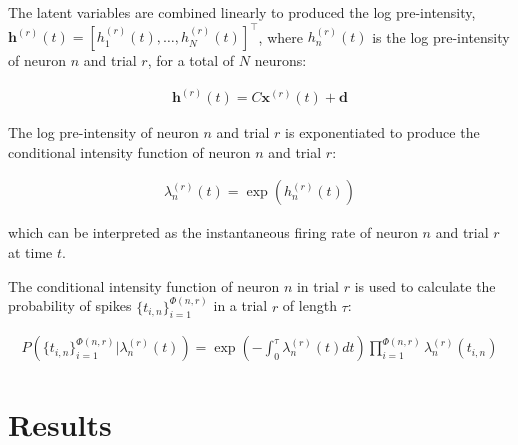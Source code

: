 \documentclass[12pt]{article}
\begin{document}
The latent variables are combined linearly to produced the log pre-intensity,
$\mathbf{h}^{(r)}(t)=[h_1^{(r)}(t),\ldots,h_N^{(r)}(t)]^\intercal$, where
$h_n^{(r)}(t)$ is the log
pre-intensity of neuron $n$ and trial $r$, for a total of $N$ neurons:

\begin{align}
    \mathbf{h}^{(r)}(t)=C\mathbf{x}^{(r)}(t)+\mathbf{d}
    \label{eq:logPreIntensity}
\end{align}

The log pre-intensity of neuron $n$ and trial $r$ is exponentiated to produce the conditional
intensity function of neuron $n$ and trial $r$:

\begin{align}
    \lambda_n^{(r)}(t)=\exp(h_n^{(r)}(t))
    \label{eq:cif}
\end{align}

\noindent which can be interpreted as the instantaneous firing rate of neuron
$n$ and trial $r$ at time $t$.

The conditional intensity function of neuron $n$ in trial $r$ is used to calculate the
probability of spikes $\{t_{i,n}\}_{i=1}^{\Phi(n,r)}$ in a trial $r$ of length $\tau$:

\begin{align*}
    P(\{t_{i,n}\}_{i=1}^{\Phi(n,r)}|\lambda_n^{(r)}(t))=\exp\left(-\int_0^\tau\lambda_n^{(r)}(t)dt\right)\prod_{i=1}^{\Phi(n,r)}\lambda_n^{(r)}(t_{i,n})
\end{align*}

\section{Results}

\begin{comment}

I estimated svGPFA models with $K=1,\ldots,15$ latent variables
(Eq.~\ref{eq:latentsVector}) and squared
exponential kernels. I selected the
model with 10 latents variables as the optimal one, since for this number of
latent variables the achieved lower bound by the models stop increasing
substantially (Figure~\ref{fig:modelSelection}).

\end{comment}
\end{document}
